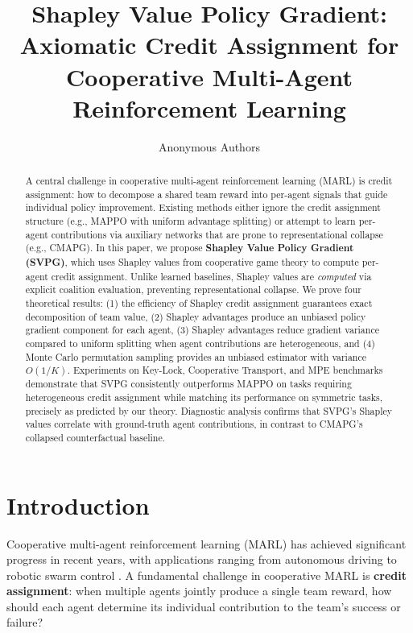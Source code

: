 \documentclass[11pt,a4paper]{article}
\title{\textbf{Shapley Value Policy Gradient:}\\
\large Axiomatic Credit Assignment for Cooperative Multi-Agent Reinforcement Learning}
\author{Anonymous Authors}
\begin{document}
\maketitle

\begin{abstract}
A central challenge in cooperative multi-agent reinforcement learning (MARL) is credit assignment: how to decompose a shared team reward into per-agent signals that guide individual policy improvement. Existing methods either ignore the credit assignment structure (e.g., MAPPO with uniform advantage splitting) or attempt to learn per-agent contributions via auxiliary networks that are prone to representational collapse (e.g., CMAPG). In this paper, we propose \textbf{Shapley Value Policy Gradient (SVPG)}, which uses Shapley values from cooperative game theory to compute per-agent credit assignment. Unlike learned baselines, Shapley values are \emph{computed} via explicit coalition evaluation, preventing representational collapse. We prove four theoretical results: (1) the efficiency of Shapley credit assignment guarantees exact decomposition of team value, (2) Shapley advantages produce an unbiased policy gradient component for each agent, (3) Shapley advantages reduce gradient variance compared to uniform splitting when agent contributions are heterogeneous, and (4) Monte Carlo permutation sampling provides an unbiased estimator with variance $O(1/K)$. Experiments on Key-Lock, Cooperative Transport, and MPE benchmarks demonstrate that SVPG consistently outperforms MAPPO on tasks requiring heterogeneous credit assignment while matching its performance on symmetric tasks, precisely as predicted by our theory. Diagnostic analysis confirms that SVPG's Shapley values correlate with ground-truth agent contributions, in contrast to CMAPG's collapsed counterfactual baseline.
\end{abstract}

\section{Introduction}

Cooperative multi-agent reinforcement learning (MARL) has achieved significant progress in recent years, with applications ranging from autonomous driving to robotic swarm control \cite{hernandez2021}. A fundamental challenge in cooperative MARL is \textbf{credit assignment}: when multiple agents jointly produce a single team reward, how should each agent determine its individual contribution to the team's success or failure?
\end{document}
